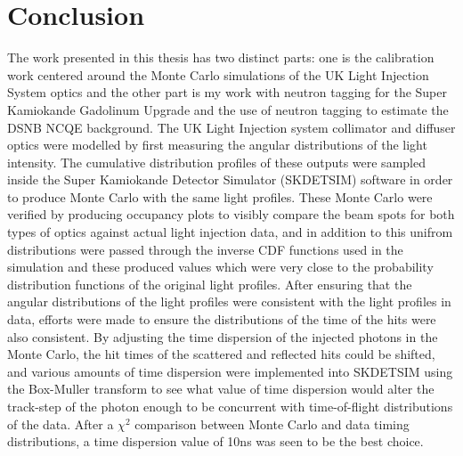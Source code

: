 \chapter{Conclusion}
\label{chp:conc}

The work presented in this thesis has two distinct parts: one is the calibration work centered around the Monte Carlo simulations of the UK Light Injection System optics and the other part is my work with neutron tagging for the Super Kamiokande Gadolinum Upgrade and the use of neutron tagging to estimate the DSNB NCQE background. 
\newline
The UK Light Injection system collimator and diffuser optics were modelled by first measuring the angular distributions of the light intensity. The cumulative distribution profiles of these outputs were sampled inside the Super Kamiokande Detector Simulator (SKDETSIM) software in order to produce Monte Carlo with the same light profiles. These Monte Carlo were verified by producing occupancy plots to visibly compare the beam spots for both types of optics against actual light injection data, and in addition to this unifrom distributions were passed through the inverse CDF functions used in the simulation and these produced values which were very close to the probability distribution functions of the original light profiles. After ensuring that the angular distributions of the light profiles were consistent with the light profiles in data, efforts were made to ensure the distributions of the time of the hits were also consistent. By adjusting the time dispersion of the injected photons in the Monte Carlo, the hit times of the scattered and reflected hits could be shifted, and various amounts of time dispersion were implemented into SKDETSIM using the Box-Muller transform to see what value of time dispersion would alter the track-step of the photon enough to be concurrent with time-of-flight distributions of the data. After a $\chi^{2}$ comparison between Monte Carlo and data timing distributions, a time dispersion value of 10ns was seen to be the best choice.
\newline

